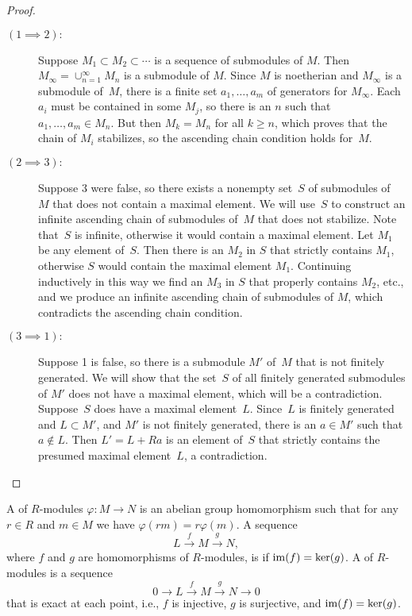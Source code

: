 \begin{proof}
  \hfill
  \begin{description}
    \item[$(1 \implies 2):$]
      Suppose $M_1\subset M_2\subset \cdots$ is a
      sequence of submodules of $M$.  Then
      $M_\infty=\cup_{n=1}^{\infty} M_n$ is a submodule of $M$.
      Since $M$ is noetherian and $M_\infty$ is a submodule of~$M$,
      there is a finite set $a_1,\dots, a_m$ of
      generators for $M_{\infty}$.  Each $a_i$
      must be contained in some $M_j$, so there is an $n$ such that
      $a_1,\dots, a_m\in M_n$.  But then $M_{k}=M_n$ for all
      $k\geq n$, which proves that the chain of $M_i$ stabilizes,
      so the ascending chain condition holds for~$M$.

    \item[$(2 \implies 3):$]
      Suppose 3 were false, so there exists
      a nonempty set~$S$ of submodules of~$M$ that does not
      contain a maximal element.  We will use~$S$ to construct
      an infinite ascending chain of submodules of~$M$ that
      does not stabilize. Note that~$S$ is infinite, otherwise
      it would contain a maximal element.  Let $M_1$ be
      any element of~$S$.  Then there is an $M_2$ in $S$ that
      strictly contains $M_1$, otherwise $S$ would contain the maximal
      element $M_1$. Continuing inductively in this way we find
      an $M_3$ in $S$ that properly contains $M_2$, etc., and we
      produce an infinite ascending chain of submodules of $M$,
      which contradicts the ascending chain condition.

    \item[$(3 \implies 1):$]
      Suppose 1 is false, so there is a submodule $M'$ of~$M$ that
      is not finitely generated.  We will show that the set~$S$ of
      all finitely generated submodules of $M'$ does not
      have a maximal element, which will be a contradiction.
      Suppose~$S$ does have a maximal element~$L$.  Since~$L$
      is finitely generated and $L\subset M'$, and $M'$ is not
      finitely generated, there is an $a\in M'$ such that
      $a\not\in L$.  Then $L'=L+Ra$ is an element of~$S$ that
      strictly contains the presumed maximal element~$L$,
      a contradiction.
  \end{description}
\end{proof}

\begin{definition}
  A  of $R$-modules $\varphi:M\to N$ is an abelian
  group homomorphism such that for any $r\in R$ and $m\in M$ we have
  $\varphi(rm) = r\varphi(m)$. A sequence
  \[
    L \xrightarrow{f} M \xrightarrow{g} N,
  \]
  where $f$ and $g$ are homomorphisms of $R$-modules, is 
  if $\operatorname{im}(f)=\ker(g)$. A  of $R$-modules
  is a sequence
  \[
    0 \to L \xrightarrow{f} M \xrightarrow{g} N \to 0
  \]
  that is exact at each point, i.e., $f$ is injective, $g$ is surjective,
  and $\operatorname{im}(f) = \ker(g)$.
\end{definition}

